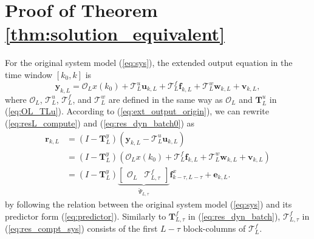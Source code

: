 \documentclass[twocolumn]{autart}
\begin{document}
\section{Proof of Theorem \ref{thm:solution_equivalent}}\label{app:equivalence}
For the original system model (\ref{eq:sys}), the extended output equation in the time window $\left[ k_0, k \right]$ is
\begin{equation}\label{eq:ext_output_origin}
\mathbf{y}_{k,L} = \mathscr{O}_{L} x(k_0) + \mathscr{T}_L^u \mathbf{u}_{k,L}
+ \mathscr{T}_{L}^{f} \mathbf{f}_{k,L} + \mathscr{T}_{L}^{w} \mathbf{w}_{k,L} + \mathbf{v}_{k,L},
\end{equation}
where $\mathscr{O}_L$, $\mathscr{T}_L^u$, $\mathscr{T}_L^f$, and $\mathscr{T}_L^w$ are defined
in the same way as $\mathcal{O}_L$ and $\mathbf{T}_L^u$ in (\ref{eq:OL_TLu}).
According to (\ref{eq:ext_output_origin}), we can rewrite (\ref{eq:resL_compute}) and (\ref{eq:res_dyn_batch0}) as
\begin{equation}\label{eq:res_compt_sys}
\begin{aligned}
\mathbf{r}_{k,L} &= \left( I - \mathbf{T}_L^y \right) \left( \mathbf{y}_{k,L} - \mathscr{T}_L^u \mathbf{u}_{k,L} \right) \\
&= \left( I - \mathbf{T}_L^y \right) \left( \mathscr{O}_{L} x(k_0) + \mathscr{T}_{L}^{f} \mathbf{f}_{k,L} + \mathscr{T}_{L}^{w} \mathbf{w}_{k,L} + \mathbf{v}_{k,L} \right)\\
&= \left( I - \mathbf{T}_L^y \right) \underbrace{\left[ \begin{array}{cc}
                                        \mathscr{O}_{L} & \mathscr{T}_{L,\tau}^{f}
                                      \end{array} \right]}_{\breve \Psi_{L,\tau}} \mathbf{f}_{k-\tau,L-\tau}^x  + \mathbf{e}_{k,L}.
\end{aligned}
\end{equation}
by following the relation between the original system model (\ref{eq:sys}) and its predictor form (\ref{eq:predictor}).
Similarly to $\mathbf{T}_{L,\tau}^f$ in (\ref{eq:res_dyn_batch}), $\mathscr{T}_{L,\tau}^{f}$ in (\ref{eq:res_compt_sys}) consists of the first $L-\tau$ block-columns of $\mathscr{T}_{L}^{f}$.
\end{document}
